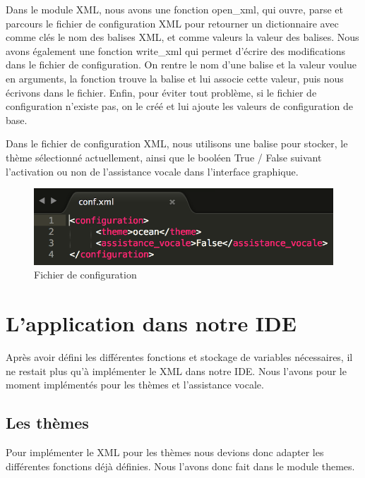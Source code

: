 \documentclass[a4paper,12pt]{article}
\begin{document}
Dans le module XML, nous avons une fonction open\_xml, qui ouvre, parse et parcours le fichier de configuration XML pour retourner un dictionnaire avec comme clés le nom des balises XML, et comme valeurs la valeur des balises. Nous avons également une fonction write\_xml qui permet d'écrire des modifications dans le fichier de configuration. On rentre le nom d'une balise et la valeur voulue en arguments, la fonction trouve la balise et lui associe cette valeur, puis nous écrivons dans le fichier. Enfin, pour éviter tout problème, si le fichier de configuration n'existe pas, on le créé et lui ajoute les valeurs de configuration de base. 
		
Dans le fichier de configuration XML, nous utilisons une balise pour stocker, le thème sélectionné actuellement, ainsi que le booléen True / False suivant l'activation ou non de l'assistance vocale dans l'interface graphique.
		
\begin{figure}[h!]
			\begin{center}
				\includegraphics[scale=0.6]{images/conf.png}
				\caption{Fichier de configuration}
			\end{center}
		\end{figure}

\section{L'application dans notre IDE}

Après avoir défini les différentes fonctions et stockage de variables nécessaires, il ne restait plus qu'à implémenter le XML dans notre IDE. Nous l'avons pour le moment implémentés pour les thèmes et l'assistance vocale.

\subsection{Les thèmes}

Pour implémenter le XML pour les thèmes nous devions donc adapter les différentes fonctions déjà définies. Nous l'avons donc fait dans le module themes.
\end{document}
